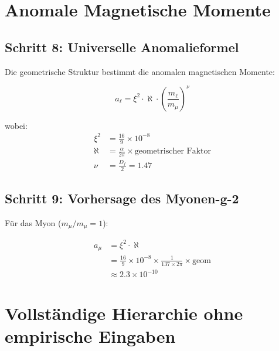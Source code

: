 \documentclass[12pt,a4paper]{article}
\newcommand{\xipar}{\xi}
\begin{document}
	\section{Anomale Magnetische Momente}
	
	\subsection{Schritt 8: Universelle Anomalieformel}
	
	Die geometrische Struktur bestimmt die anomalen magnetischen Momente:
	
	\begin{equation}
		a_\ell = \xipar^2 \cdot \aleph \cdot \left(\frac{m_\ell}{m_\mu}\right)^\nu
	\end{equation}
	
	wobei:
	\begin{align}
		\xipar^2 &= \frac{16}{9} \times 10^{-8} \\
		\aleph &= \frac{\alpha}{2\pi} \times \text{geometrischer Faktor} \\
		\nu &= \frac{D_f}{2} = 1.47
	\end{align}
	
	\subsection{Schritt 9: Vorhersage des Myonen-g-2}
	
	Für das Myon ($m_\mu/m_\mu = 1$):
	
	\begin{keyresult}
		\begin{align}
			a_\mu &= \xipar^2 \cdot \aleph \\
			&= \frac{16}{9} \times 10^{-8} \times \frac{1}{137 \times 2\pi} \times \text{geom} \\
			&\approx 2.3 \times 10^{-10}
		\end{align}
	\end{keyresult}
	
	\section{Vollständige Hierarchie ohne empirische Eingaben}
	
\end{document}
